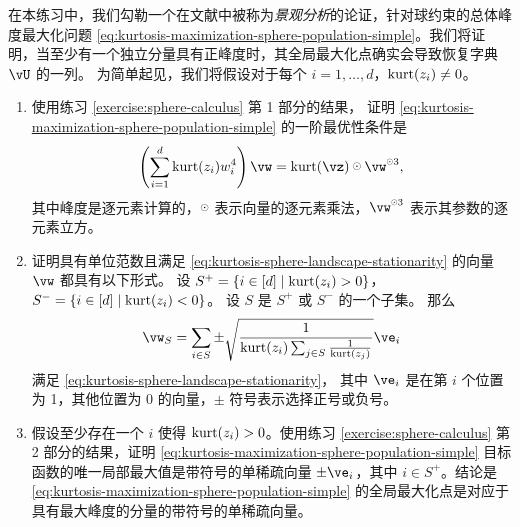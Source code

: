 \documentclass[../../book-main_zh.tex]{subfiles}
\begin{document}
\begin{exercise}\label{exercise:kurtosis-sphere-landscape}
    在本练习中，我们勾勒一个在文献中被称为\textit{景观分析}的论证，针对球约束的总体峰度最大化问题 \eqref{eq:kurtosis-maximization-sphere-population-simple}。我们将证明，当至少有一个独立分量具有正峰度时，其全局最大化点确实会导致恢复字典 $\vU$ 的一列。
    为简单起见，我们将假设对于每个 $i = 1, \dots, d$，$\mathop{\mathrm{kurt}}(z_i) \neq 0$。
    \begin{enumerate}
        \item 使用练习 \ref{exercise:sphere-calculus} 第 1 部分的结果，
        证明 \eqref{eq:kurtosis-maximization-sphere-population-simple} 的一阶最优性条件是
        \begin{equation}\label{eq:kurtosis-sphere-landscape-stationarity}
            \left(\sum_{i=1}^d \kurt(z_i) w_i^4 \right) 
            \vw = \kurt(\vz) \hada \vw^{\hada 3}, 
        \end{equation}
        其中峰度是逐元素计算的，$\hada$ 表示向量的逐元素乘法，$\vw^{\hada 3}$ 表示其参数的逐元素立方。
        \item 证明具有单位范数且满足 \eqref{eq:kurtosis-sphere-landscape-stationarity} 的向量 $\vw$
        都具有以下形式。
        设 $S^+ = \set{i \in [d] \given \kurt(z_i) > 0}$，
        $S^- = \set{i \in [d] \given \kurt(z_i) < 0}$。
        设 $S$ 是 $S^+$ 或 $S^-$ 的一个子集。
        那么
        \begin{equation}\label{eq:kurtosis-sphere-landscape-cps}
            \vw_S = \sum_{i \in S} \pm \sqrt{\frac{1}{\kurt(z_i) \sum_{j \in S} \frac{1}{\kurt(z_j)}}} \ve_i
        \end{equation}
        满足 \eqref{eq:kurtosis-sphere-landscape-stationarity}，
        其中 $\ve_i$ 是在第 $i$ 个位置为 1，其他位置为 0 的向量，$\pm$ 符号表示选择正号或负号。
        \item 假设至少存在一个 $i$ 使得 $\mathop{\mathrm{kurt}}(z_i) > 0$。使用练习 \ref{exercise:sphere-calculus} 第 2 部分的结果，证明 \eqref{eq:kurtosis-maximization-sphere-population-simple} 目标函数的唯一局部最大值是带符号的单稀疏向量 $\pm \ve_i$，其中 $i \in S^+$。结论是 \eqref{eq:kurtosis-maximization-sphere-population-simple} 的全局最大化点是对应于具有最大峰度的分量的带符号的单稀疏向量。%

\end{enumerate}
\end{exercise}
\end{document}
